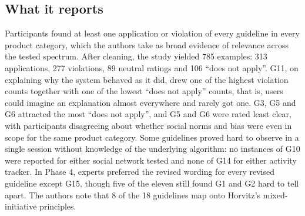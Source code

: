 \subsection{What it reports}

Participants found at least one application or violation of every guideline in every product category, which the authors take as broad evidence of relevance across the tested spectrum. After cleaning, the study yielded 785 examples: 313 applications, 277 violations, 89 neutral ratings and 106 ``does not apply''. G11, on explaining why the system behaved as it did, drew one of the highest violation counts together with one of the lowest ``does not apply'' counts, that is, users could imagine an explanation almost everywhere and rarely got one. G3, G5 and G6 attracted the most ``does not apply'', and G5 and G6 were rated least clear, with participants disagreeing about whether social norms and bias were even in scope for the same product category. Some guidelines proved hard to observe in a single session without knowledge of the underlying algorithm: no instances of G10 were reported for either social network tested and none of G14 for either activity tracker. In Phase 4, experts preferred the revised wording for every revised guideline except G15, though five of the eleven still found G1 and G2 hard to tell apart. The authors note that 8 of the 18 guidelines map onto Horvitz's mixed-initiative principles.

